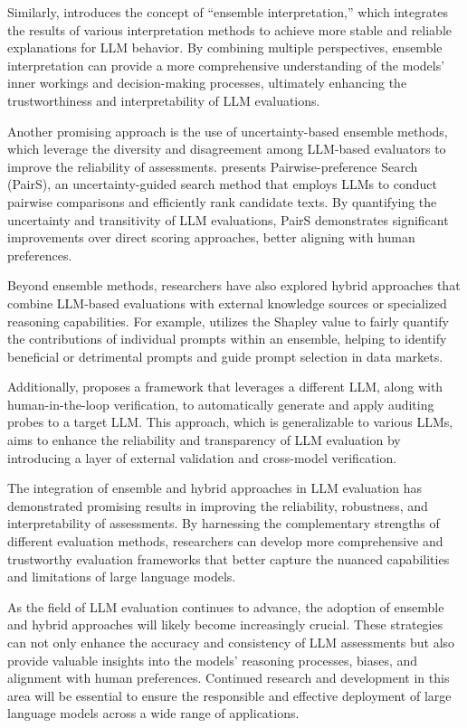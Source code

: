 \documentclass[11pt]{article}
\begin{document}
Similarly, \cite{ref145} introduces the concept of ``ensemble interpretation,'' which integrates the results of various interpretation methods to achieve more stable and reliable explanations for LLM behavior. By combining multiple perspectives, ensemble interpretation can provide a more comprehensive understanding of the models' inner workings and decision-making processes, ultimately enhancing the trustworthiness and interpretability of LLM evaluations.

Another promising approach is the use of uncertainty-based ensemble methods, which leverage the diversity and disagreement among LLM-based evaluators to improve the reliability of assessments. \cite{ref143} presents Pairwise-preference Search (PairS), an uncertainty-guided search method that employs LLMs to conduct pairwise comparisons and efficiently rank candidate texts. By quantifying the uncertainty and transitivity of LLM evaluations, PairS demonstrates significant improvements over direct scoring approaches, better aligning with human preferences.

Beyond ensemble methods, researchers have also explored hybrid approaches that combine LLM-based evaluations with external knowledge sources or specialized reasoning capabilities. For example, \cite{ref146} utilizes the Shapley value to fairly quantify the contributions of individual prompts within an ensemble, helping to identify beneficial or detrimental prompts and guide prompt selection in data markets.

Additionally, \cite{ref147} proposes a framework that leverages a different LLM, along with human-in-the-loop verification, to automatically generate and apply auditing probes to a target LLM. This approach, which is generalizable to various LLMs, aims to enhance the reliability and transparency of LLM evaluation by introducing a layer of external validation and cross-model verification.

The integration of ensemble and hybrid approaches in LLM evaluation has demonstrated promising results in improving the reliability, robustness, and interpretability of assessments. By harnessing the complementary strengths of different evaluation methods, researchers can develop more comprehensive and trustworthy evaluation frameworks that better capture the nuanced capabilities and limitations of large language models.

As the field of LLM evaluation continues to advance, the adoption of ensemble and hybrid approaches will likely become increasingly crucial. These strategies can not only enhance the accuracy and consistency of LLM assessments but also provide valuable insights into the models' reasoning processes, biases, and alignment with human preferences. Continued research and development in this area will be essential to ensure the responsible and effective deployment of large language models across a wide range of applications.
\end{document}
